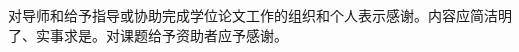 \begin{acknowledgements}
    对导师和给予指导或协助完成学位论文工作的组织和个人表示感谢。内容应简洁明了、实事求是。对课题给予资助者应予感谢。
 
 \end{acknowledgements}
 